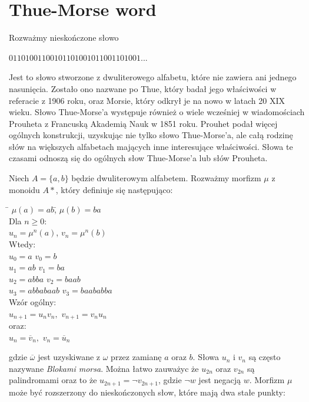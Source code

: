 \documentclass[document]{xmgr}
\begin{document}
\section{Thue-Morse word}
Rozważmy nieskończone słowo

{\centering $01101001100101101001011001101001 ...$ \par}

Jest to słowo stworzone z dwuliterowego alfabetu, które nie zawiera ani jednego nasunięcia. Zostało ono nazwane po Thue, który badał jego właściwości w referacie z 1906 roku, oraz Morsie, który odkrył je na nowo w latach 20 XIX wieku. Słowo Thue-Morse'a występuje również o wiele wcześniej w wiadomościach  Prouheta \cite{prouhet} z Francuską Akademią Nauk w 1851 roku. Prouhet podał więcej ogólnych konstrukcji, uzyskując nie tylko słowo Thue-Morse'a, ale całą rodzinę słów na większych alfabetach mających inne interesujące właściwości. Słowa te czasami odnoszą się do ogólnych słow Thue-Morse'a lub słów Prouheta.

Niech $A = \{a, b\}$ będzie dwuliterowym alfabetem. Rozważmy morfizm $\mu$ z monoidu $A*$, który definiuje się następująco:



\begin{tabbing}

\hspace{8em}\= $\mu(a) = ab$,\hspace{7em}\= $\mu(b) = ba$\\
Dla $n \geq 0$:\\
\> $u_n = \mu^n(a)$,\> $v_n = \mu^n(b)$\\
Wtedy:\\
\> $u_0 = a$ \> $v_0 = b$\\
\> $u_1 = ab$ \> $v_1 = ba$\\
\> $u_2 = abba$	 \> $v_2 = baab$\\
\> $u_3 = abbabaab$ \> $v_3 = baababba$\\
Wzór ogólny:\\
\> $u_{n+1} = u_n v_n,$ \> $v_{n+1} = v_n u_n$\\
oraz:\\
\> $u_n = \overline{v}_n,$ \> $v_n = \overline{u}_n$
\end{tabbing}

gdzie $\overline{\omega}$ jest uzyskiwane z $\omega$ przez zamianę $a$ oraz $b$. Słowa $u_n$ i $v_n$ są często nazywane \textit{Blokami morsa}. Można łatwo zauważyc że $u_{2n}$ oraz $v_{2n}$ są palindromami oraz to że $u_{2n+1} = \neg v_{2n+1}$, gdzie $\neg w$ jest negacją $w$. Morfizm $\mu$ może być rozszerzony do nieskończonych słow, które mają dwa stałe punkty:
\end{document}
